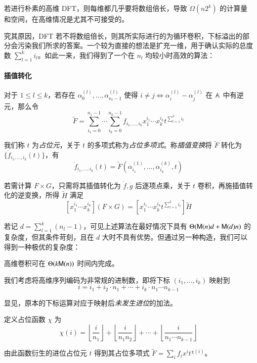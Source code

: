 若进行朴素的高维 DFT，则每维都几乎要将数组倍长，导致 $\Omega(n2^k)$ 的计算量和空间，在高维情况是尤其不可接受的。

究其原因，DFT 若不将数组倍长，则其所实际进行的为循环卷积，下标溢出的部分会污染我们所求的答案。一个较为直接的想法是扩充一维，用于确认实际的总度数 $\sum_{l=1}^k i_l$。如此一来，我们得到了一个在 $n_l$ 均较小时高效的算法：

\paragraph{插值转化}
对于 $1\le l\le k$，若存在 $\alpha^{(l)}_0,\dots,\alpha^{(l)}_{n_l-1}$ 使得 $i\neq j \Leftrightarrow \alpha^{(l)}_i - \alpha^{(l)}_j$ 在 $\mathbb A$ 中有逆元，那么令 
$$
\tilde F = \sum_{i_1=0}^{n_1-1} \cdots \sum_{i_k=0}^{n_k-1} f_{i_1,\dots,i_k} x_1^{i_1}\cdots x_k^{i_k} t^{\sum_{l=1}^k i_l}
$$

我们称 $t$ 为\emph{占位元}，关于 $t$ 的多项式称为\emph{占位多项式}。称\emph{插值变换}将 $\tilde F$ 转化为 $\{\dot f_{i_1,\dots,i_k}(t)\}$，有
$$
\dot f_{i_1,\dots,i_k}(t) = \tilde F(\alpha^{(1)}_{i_1},\dots,\alpha^{(k)}_{i_k},t)
$$

若需计算 $F\times G$，只需将其插值转化为 $\dot f, \dot g$ 后逐项点乘，关于 $t$ 卷积，再施插值转化的逆变换，所得 $\tilde H$ 满足
$$
[x_1^{i_1}\cdots x_k^{i_k}] (F\times G) = \left[x_1^{i_1}\cdots x_k^{i_k}t^{\sum_{l=1}^k i_l}\right] \tilde H
$$

若记 $d = \sum_{l=1}^k (n_l-1)$，可见上述算法在最好情况下具有 $\Theta(\mathsf M(n)d + \mathsf M(d)n)$ 的复杂度，但其条件苛刻，且在 $d$ 大时不具有优势。但通过另一种构造，我们可以得到一种极优的复杂度：

\begin{theorem}
高维卷积可在 $\Theta(k\mathsf M(n))$ 时间内完成。
\end{theorem}

我们考虑将高维序列编码为非常规的进制数，即将下标 $(i_1,\dots,i_k)$ 映射到
$$
i = i_1 + i_2\cdot n_1 + \cdots + i_k \cdot n_1\cdots n_{k-1}
$$

显见，原本的下标运算对应于映射后\emph{未发生进位}的加法。

\begin{definition}[进位占位元]
定义占位函数 $\chi$ 为
$$
\chi(i) = \left\lfloor \frac{i}{n_1}\right\rfloor + \left\lfloor \frac{i}{n_1n_2}\right\rfloor + \cdots + \left\lfloor \frac{i}{n_1\cdots n_{k-1}}\right\rfloor
$$

由此函数衍生的进位占位元 $t$ 得到其占位多项式 $\tilde F = \sum_i f_i x^i t^{\chi (i)}$。
\end{definition}

